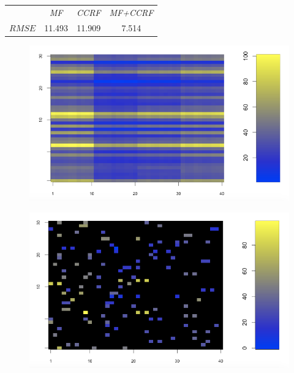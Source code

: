 \vspace{2cm}
\begin{table}[!ht]
\centering
\begin{tabular}{ c | c | c | c }
   & \textit{MF} & \textit{CCRF} & \textit{MF+CCRF} \\
$RMSE$ & 11.493& 11.909& 7.514   
\end{tabular}
\label{tab:x}
\end{table}

\begin{figure}
\centering
\begin{minipage}{.5\textwidth}
  \centering
  \includegraphics[width=1\linewidth]{num_exp_ccrf_pred.png}
  \label{fig:test1}
\end{minipage}%
\begin{minipage}{.5\textwidth}
  \centering
  \includegraphics[width=1\linewidth]{num_exp_train_data.png}
  \label{fig:test2}
\end{minipage}
\end{figure}


